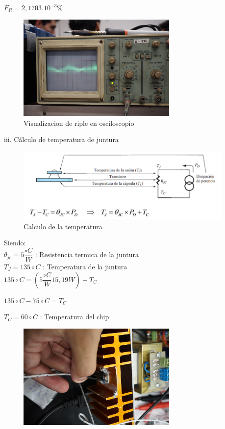 $F_R = 2,1703 . 10^{-3}\percent $ \\

\begin{figure}[H]
  \centering
  \includegraphics[width=0.70\textwidth]{images/medicionRipple.png}
  \caption{Visualizacion de riple en osciloscopio}
\end{figure}


iii. Cálculo de temperatura de juntura \\

\begin{figure}[H]
  \centering
  \includegraphics[width=0.95\textwidth]{images/calculoTemperatura.png}
  \caption{Calculo de la temperatura}
\end{figure}

Siendo: \\

$\theta_{jc} = 5\dfrac{\circ C}{W} $ : Resistencia termica de la juntura \\

$T_J = 135 \circ C$ : Temperatura de la juntura \\

$135 \circ C = (5 \dfrac{\circ C}{W} 15,19 W) + T_C $

$135 \circ C - 75 \circ C = T_C$

$T_C = 60 \circ C$ : Temperatura del chip

\begin{figure}[H]
  \centering
  \includegraphics[width=0.70\textwidth]{images/medicionTemperatura.png}
\end{figure}

